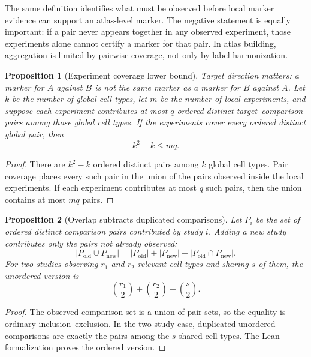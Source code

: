 \documentclass{article}
\newtheorem{proposition}{Proposition}
\begin{document}
The same definition identifies what must be observed before local marker evidence can support an atlas-level marker. The negative statement is equally important: if a pair never appears together in any observed experiment, those experiments alone cannot certify a marker for that pair. In atlas building, aggregation is limited by pairwise coverage, not only by label harmonization.

\begin{proposition}[Experiment coverage lower bound]\label{prop:experiment-coverage-lower-bound}
Target direction matters: a marker for $A$ against $B$ is not the same marker as a marker for $B$ against $A$. Let $k$ be the number of global cell types, let $m$ be the number of local experiments, and suppose each experiment contributes at most $q$ ordered distinct target--comparison pairs among those global cell types. If the experiments cover every ordered distinct global pair, then
\[
  k^2-k \leq m q.
\]
\end{proposition}

\begin{proof}
There are $k^2-k$ ordered distinct pairs among $k$ global cell types. Pair coverage places every such pair in the union of the pairs observed inside the local experiments. If each experiment contributes at most $q$ such pairs, then the union contains at most $mq$ pairs.
\end{proof}

\begin{proposition}[Overlap subtracts duplicated comparisons]\label{prop:experiment-overlap-correction}
Let $P_i$ be the set of ordered distinct comparison pairs contributed by study $i$. Adding a new study contributes only the pairs not already observed:
\[
  \left|P_{\mathrm{old}}\cup P_{\mathrm{new}}\right|
  =
  \left|P_{\mathrm{old}}\right|
  +
  \left|P_{\mathrm{new}}\right|
  -
  \left|P_{\mathrm{old}}\cap P_{\mathrm{new}}\right|.
\]
For two studies observing $r_1$ and $r_2$ relevant cell types and sharing $s$ of them, the unordered version is
\[
  \binom{r_1}{2}+\binom{r_2}{2}-\binom{s}{2}.
\]
\end{proposition}

\begin{proof}
The observed comparison set is a union of pair sets, so the equality is ordinary inclusion--exclusion. In the two-study case, duplicated unordered comparisons are exactly the pairs among the $s$ shared cell types. The Lean formalization proves the ordered version.
\end{proof}
\end{document}
